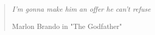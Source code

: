 

%	

\vspace*{5cm} 
\begin{quote} 
	\begin{flushright}
		\textit{I'm gonna make him an offer he can't refuse}
		
		Marlon Brando in "The Godfather"
	\end{flushright}
\end{quote}